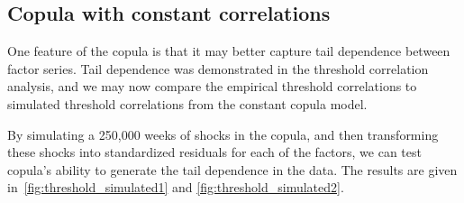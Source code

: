 
\subsection{Copula with constant correlations}
One feature of the copula is that it may better capture tail dependence between factor series. Tail dependence was demonstrated in the threshold correlation analysis, and we may now compare the empirical threshold correlations to simulated threshold correlations from the constant copula model.

By simulating a 250,000 weeks of shocks in the copula, and then transforming these shocks into standardized residuals for each of the factors, we can test copula's ability to generate the tail dependence in the data. The results are given in~\autoref{fig:threshold_simulated1} and \autoref{fig:threshold_simulated2}.

